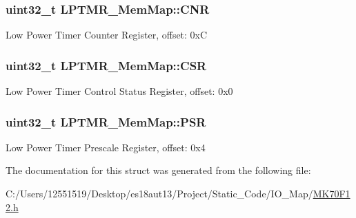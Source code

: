 \subsubsection[{C\+N\+R}]{\setlength{\rightskip}{0pt plus 5cm}uint32\+\_\+t L\+P\+T\+M\+R\+\_\+\+Mem\+Map\+::\+C\+N\+R}\label{struct_l_p_t_m_r___mem_map_adda036ea26ea5cc89d7957779c5680f0}
Low Power Timer Counter Register, offset\+: 0x\+C \hypertarget{struct_l_p_t_m_r___mem_map_a4dcb593756f09d67e3d064d95e3f2d68}{}
\subsubsection[{C\+S\+R}]{\setlength{\rightskip}{0pt plus 5cm}uint32\+\_\+t L\+P\+T\+M\+R\+\_\+\+Mem\+Map\+::\+C\+S\+R}\label{struct_l_p_t_m_r___mem_map_a4dcb593756f09d67e3d064d95e3f2d68}
Low Power Timer Control Status Register, offset\+: 0x0 \hypertarget{struct_l_p_t_m_r___mem_map_a05f0c5c90722e5a1757c262c818d2462}{}
\subsubsection[{P\+S\+R}]{\setlength{\rightskip}{0pt plus 5cm}uint32\+\_\+t L\+P\+T\+M\+R\+\_\+\+Mem\+Map\+::\+P\+S\+R}\label{struct_l_p_t_m_r___mem_map_a05f0c5c90722e5a1757c262c818d2462}
Low Power Timer Prescale Register, offset\+: 0x4 

The documentation for this struct was generated from the following file\+:\begin{DoxyCompactItemize}
\item 
C\+:/\+Users/12551519/\+Desktop/es18aut13/\+Project/\+Static\+\_\+\+Code/\+I\+O\+\_\+\+Map/\hyperlink{_m_k70_f12_8h}{M\+K70\+F12.\+h}\end{DoxyCompactItemize}

